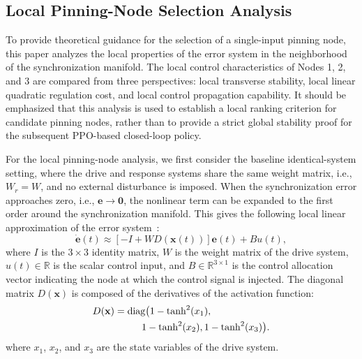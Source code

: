 \documentclass[10pt,twocolumn]{article}
\theoremstyle{definition}
\begin{document}
\subsection{Local Pinning-Node Selection Analysis}
\label{subsec:local_node_selection}

To provide theoretical guidance for the selection of a single-input pinning node, this paper analyzes the local properties of the error system in the neighborhood of the synchronization manifold. The local control characteristics of Nodes 1, 2, and 3 are compared from three perspectives: local transverse stability, local linear quadratic regulation cost, and local control propagation capability. It should be emphasized that this analysis is used to establish a local ranking criterion for candidate pinning nodes, rather than to provide a strict global stability proof for the subsequent PPO-based closed-loop policy.

For the local pinning-node analysis, we first consider the baseline identical-system setting, where the drive and response systems share the same weight matrix, i.e., $W_r=W$, and no external disturbance is imposed. When the synchronization error approaches zero, i.e., $\mathbf{e}\to \mathbf{0}$, the nonlinear term can be expanded to the first order around the synchronization manifold. This gives the following local linear approximation of the error system~\cite{slotine1991applied}:
\begin{equation}
	\dot{\mathbf{e}}(t)
	\approx
	\left[-I+WD(\mathbf{x}(t))\right]\mathbf{e}(t)
	+
	Bu(t),
	\label{eq:local_linear_error}
\end{equation}
where $I$ is the $3\times 3$ identity matrix, $W$ is the weight matrix of the drive system, $u(t)\in\mathbb{R}$ is the scalar control input, and $B\in\mathbb{R}^{3\times 1}$ is the control allocation vector indicating the node at which the control signal is injected. The diagonal matrix $D(\mathbf{x})$ is composed of the derivatives of the activation function:
\begin{equation}
\begin{aligned}
D(\mathbf{x})
&=\mathrm{diag}\bigl(1-\tanh^2(x_1),\\
&\hspace{2.8em}1-\tanh^2(x_2),
1-\tanh^2(x_3)\bigr).
\end{aligned}
\label{eq:D_matrix}
\end{equation}
where $x_1$, $x_2$, and $x_3$ are the state variables of the drive system.
\end{document}
